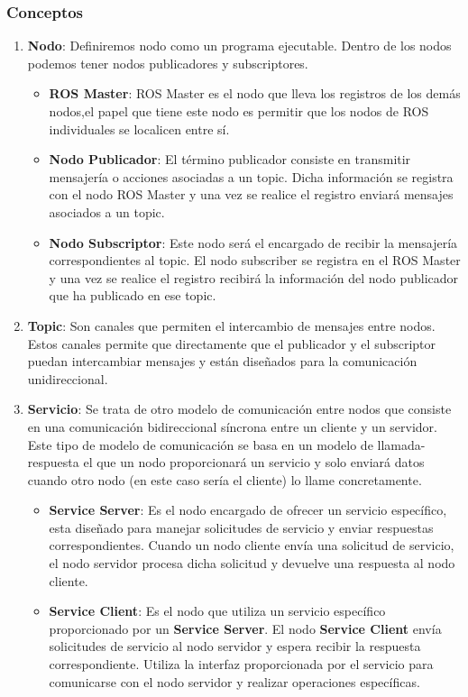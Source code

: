 \subsubsection{Conceptos}
\label{sec:conceptos}

\begin{enumerate}
    \item \textbf{Nodo}: Definiremos nodo como un programa ejecutable. Dentro de los nodos podemos tener nodos publicadores y subscriptores. 
        \begin{itemize}
            \item \textbf{ROS Master}: ROS Master es el nodo que lleva los registros de los demás nodos,el papel que tiene este nodo es permitir que los nodos de ROS individuales se localicen entre sí. 
            \item \textbf{Nodo Publicador}: El término publicador consiste en transmitir mensajería o acciones asociadas a un topic. 
            Dicha información se registra con el nodo ROS Master y una vez se realice el registro enviará mensajes asociados a un topic.
            \item \textbf{Nodo Subscriptor}: Este nodo será el encargado de recibir la mensajería correspondientes al topic. 
            El nodo subscriber se registra en el ROS Master y una vez se realice el registro recibirá la información del nodo publicador que ha publicado en ese topic.
        \end{itemize}
    \item \textbf{Topic}: Son canales que permiten el intercambio de mensajes entre nodos. Estos canales permite que directamente que el publicador y el subscriptor puedan intercambiar
    mensajes y están diseñados para la comunicación unidireccional.
    \item \textbf{Servicio}: Se trata de otro modelo de comunicación entre nodos que consiste en una comunicación bidireccional síncrona entre un cliente
    y un servidor. Este tipo de modelo de comunicación se basa en un modelo de llamada-respuesta el que un nodo proporcionará 
    un servicio y solo enviará datos cuando otro nodo (en este caso sería el cliente) lo llame concretamente. 
        \begin{itemize}
          \item \textbf{Service Server}: Es el nodo encargado de ofrecer un servicio específico, esta diseñado para manejar solicitudes de servicio y enviar respuestas correspondientes. Cuando un nodo cliente
                                         envía una solicitud de servicio, el nodo servidor procesa dicha solicitud y devuelve una respuesta al nodo cliente.
          \item \textbf{Service Client}: Es el nodo que utiliza un servicio específico proporcionado por un \textbf{Service Server}. El nodo \textbf{Service Client} envía solicitudes de servicio al nodo servidor y espera recibir la respuesta correspondiente.
                                         Utiliza la interfaz proporcionada por el servicio para comunicarse con el nodo servidor y realizar operaciones específicas.  
            

\end{itemize}
\end{enumerate}
